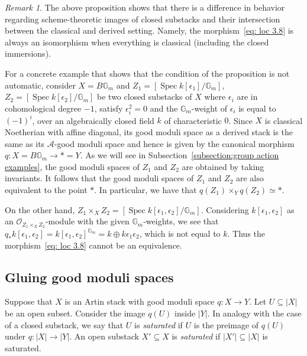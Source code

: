 \documentclass[a4paper,twoside,11pt]{amsart}
\theoremstyle{plain}
\theoremstyle{definition}
\theoremstyle{remark}
\newtheorem{remark}[theorem]{Remark}
\numberwithin{equation}{section}
\newcommand{\GG}{\mathbb{G}} %
\newcommand\sA{\mathcal{A}}
\DeclareMathOperator{\Spec}{Spec} %
\newcommand{\oO}{\mathcal{O}}
\begin{document}
\begin{remark}
    The above proposition shows that there is a difference in behavior regarding scheme-theoretic images of closed substacks and their intersection between the classical and derived setting. Namely, the morphism~\eqref{eq: loc 3.8} is always an isomorphism when everything is classical (including the closed immersions). 

    For a concrete example that shows that the condition of the proposition is not automatic, consider $X = B\GG_m$ and $Z_1 = [\Spec k[\epsilon_1] / \GG_m]$, $Z_2 = [\Spec k[\epsilon_2] / \GG_m]$ be two closed substacks of $X$ where $\epsilon_i$ are in cohomological degree $-1$, satisfy $\epsilon_i^2 = 0$ and the $\GG_m$-weight of $\epsilon_i$ is equal to $(-1)^i$, over an algebraically closed field $k$ of characteristic $0$. Since $X$ is classical Noetherian with affine diagonal, its good moduli space as a derived stack is the same as its $\sA$-good moduli space and hence is given by the canonical morphism $q \colon X = B\GG_m \to *=Y$. As we will see in Subsection~\ref{subsection:group action examples}, the good moduli spaces of $Z_1$ and $Z_2$ are obtained by taking invariants. It follows that the good moduli spaces of $Z_1$ and $Z_2$ are also equivalent to the point $*$. In particular, we have that $q(Z_1) \times_Y q(Z_2) \simeq *$. 
    
    On the other hand, $Z_1 \times_X Z_2 = [\Spec k[\epsilon_1, \epsilon_2] / \GG_m]$. Considering $k[\epsilon_1, \epsilon_2]$ as an $\oO_{Z_1 \times_X Z_2}$-module with the given $\GG_m$-weights, we see that $q_\ast k[\epsilon_1, \epsilon_2] = k[\epsilon_1, \epsilon_2]^{\GG_m} = k \oplus k \epsilon_1 \epsilon_2$, which is not equal to $k$. Thus the morphism~\eqref{eq: loc 3.8} cannot be an equivalence.
\end{remark}

\subsection{Gluing good moduli spaces} 
Suppose that $X$ is an Artin stack with good moduli space $q \colon X \to Y$. Let $U \subseteq \lvert X \rvert$ be an open subset. Consider the image $q (U)$ inside $\lvert Y \rvert$. In analogy with the case of a closed substack, we say that $U$ is \textit{saturated} if $U$ is the preimage of $q(U)$ under $q \colon \lvert X \rvert \to \lvert Y \rvert$. An open substack $X' \subseteq X$ is \emph{saturated} if $\lvert X'\rvert \subseteq \lvert X \rvert$ is saturated. 
\end{document}
